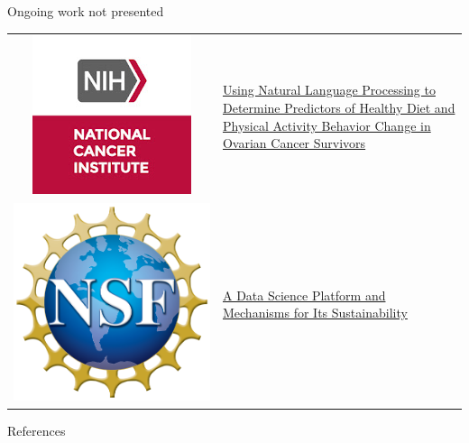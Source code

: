 \documentclass[14pt]{beamer}
\begin{document}
\begin{frame}{Ongoing work not presented}
\begin{tabular}{ @{} c p{} @{}}
\includegraphics[trim=40 20 40 20, clip, height=.15\textheight, valign=t]{nih_nci.jpg}
&
\href{https://reporter.nih.gov/project-details/10510666}{Using Natural Language Processing to Determine Predictors of Healthy Diet and Physical Activity Behavior Change in Ovarian Cancer Survivors}
\\[6.5ex]

\includegraphics[trim=50 50 50 50, clip, height=.1\textheight, valign=t]{nsf.png}
&
\href{https://www.nsf.gov/awardsearch/showAward?AWD_ID=1831551}{A Data Science Platform and Mechanisms for Its Sustainability}
\end{tabular}
\end{frame}




\appendix

\begin{frame}[allowframebreaks]{References}
\scriptsize


\end{frame}
\end{document}
